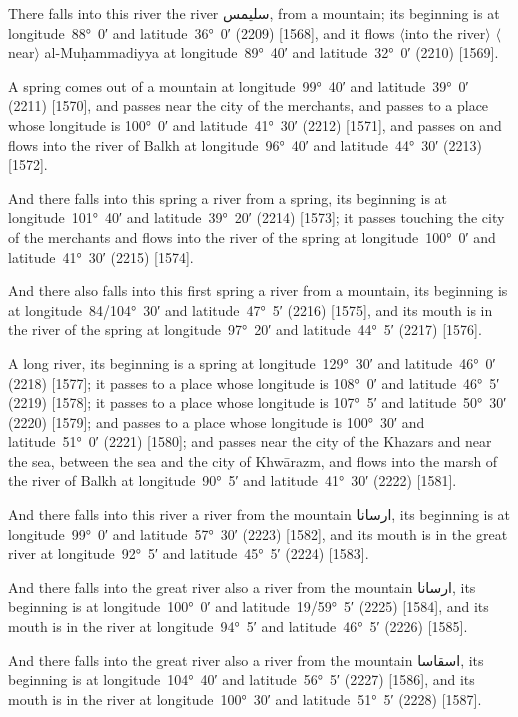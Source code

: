 \documentclass[11pt]{article}
\newcommand{\Pg}[1]{\marginpar{\footnotesize #1}}
\newcommand{\Ang}[1]{\ensuremath{#1}}
\begin{document}
There falls into this river the river \textarabic{سليمس}, from a mountain; its beginning is at longitude~88°~0′ and latitude~36°~0′ (2209) [1568], and it flows \Ang{\langle}into the river\Ang{\rangle} \Ang{\langle}near\Ang{\rangle} al-Muḥammadiyya at longitude~89°~40′ and latitude~32°~0′ (2210) [1569].

A spring comes out of a mountain at longitude~99°~40′ and latitude~39°~0′ (2211) [1570], and passes near the city of the merchants, and passes to a place whose longitude is 100°~0′ and latitude~41°~30′ (2212) [1571], and passes on and flows into the river of Balkh at longitude~96°~40′ and latitude~44°~30′ (2213) [1572].

And there falls into this spring a river from a spring, its beginning is at longitude~101°~40′ and latitude~39°~20′ (2214) [1573]; it passes touching the city of the merchants and flows into the river of the spring at longitude~100°~0′ and latitude~41°~30′ (2215) [1574]\Pg{p. 147}.

And there also falls into this first spring a river from a mountain, its beginning is at longitude~84/104°~30′ and latitude~47°~5′ (2216) [1575], and its mouth is in the river of the spring at longitude~97°~20′ and latitude~44°~5′ (2217) [1576].

A long river, its beginning is a spring at longitude~129°~30′ and latitude~46°~0′ (2218) [1577]; it passes to a place whose longitude is 108°~0′ and latitude~46°~5′ (2219) [1578]; it passes to a place whose longitude is 107°~5′ and latitude~50°~30′ (2220) [1579]; and passes to a place whose longitude is 100°~30′ and latitude~51°~0′ (2221) [1580]; and passes near the city of the Khazars and near the sea, between the sea and the city of Khwārazm, and flows into the marsh of the river of Balkh at longitude~90°~5′ and latitude~41°~30′ (2222) [1581].

And there falls into this river a river from the mountain \textarabic{ارسانا}, its beginning is at longitude~99°~0′ and latitude~57°~30′ (2223) [1582], and its mouth is in the great river at longitude~92°~5′ and latitude~45°~5′ (2224) [1583].

And there falls into the great river also a river from the mountain \textarabic{ارسانا}, its beginning is at longitude~100°~0′ and latitude~19/59°~5′ (2225) [1584], and its mouth is in the river at longitude~94°~5′ and latitude~46°~5′ (2226) [1585].

And there falls into the great river also a river from the mountain \textarabic{اسقاسا}, its beginning is at longitude~104°~40′ and latitude~56°~5′ (2227) [1586], and its mouth is in the river at longitude~100°~30′ and latitude~51°~5′ (2228) [1587].
\end{document}
